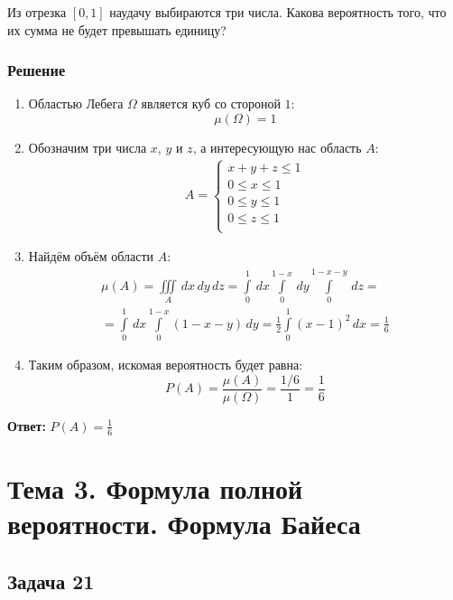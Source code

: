 \documentclass[14pt]{article}
\begin{document}
    Из отрезка $[0,1]$ наудачу выбираются три числа.
    Какова вероятность того, что их сумма не будет превышать единицу?

    \subsubsection*{Решение}
    \begin{enumerate}[wide, labelwidth=!, labelindent=0pt]
        \item Областью Лебега $\Omega$ является куб со стороной $1$:
            \[\mu(\Omega) = 1\]
        \item Обозначим три числа $x$, $y$ и $z$, а интересующую нас область $A$:
            \begin{gather*}
                A =
                \begin{cases}
                    x + y + z \leq 1 \\
                    0 \leq x \leq 1 \\
                    0 \leq y \leq 1 \\
                    0 \leq z \leq 1 \\
                \end{cases}
            \end{gather*}
        \item Найдём объём области $A$:
            \begin{gather*}
                \mu(A) = \iiint \limits_{A} \,dx \, dy \, dz =  \int \limits_0^1 \, dx \int \limits_0^{1 - x} \, dy \int \limits_0^{1 - x - y} \, dz = \\
                = \int \limits_0^1 \, dx \int \limits_0^{1 - x} (1 - x - y) \, dy = \frac{1}{2} \int \limits_0^1  (x - 1)^2 \, dx = \frac{1}{6}
            \end{gather*}
        \item Таким образом, искомая вероятность будет равна:
            \[P(A) = \frac{\mu(A)}{\mu(\Omega)} = \frac{1/6}{1} = \frac{1}{6}\]
    \end{enumerate}
    \hspace{290pt}\textbf{Ответ:} $P(A) = \frac{1}{6}$

    \newpage

    \section*{Тема 3. Формула полной вероятности. Формула Байеса}

    \subsection*{Задача 21}
\end{document}
